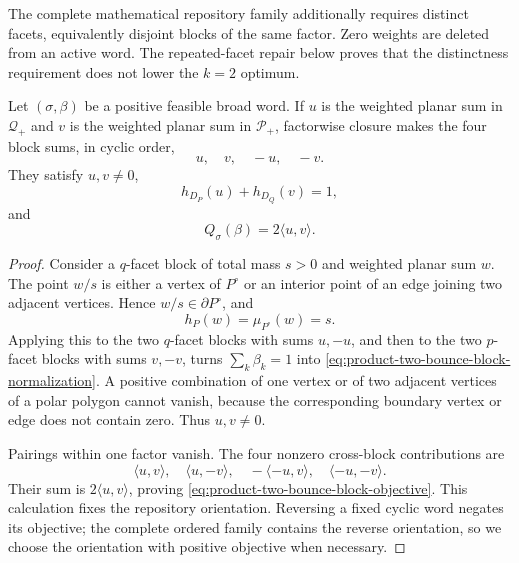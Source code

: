 The complete mathematical repository family additionally requires distinct
facets, equivalently disjoint blocks of the same factor.  Zero weights are
deleted from an active word.  The repeated-facet repair below proves that the
distinctness requirement does not lower the \(k=2\) optimum.

\begin{unverified}
\begin{lemma}
\label{lem:product-two-bounce-block-collapse}
Let \((\sigma,\beta)\) be a positive feasible broad word.  If \(u\) is the
weighted planar sum in \(\mathcal Q_+\) and \(v\) is the weighted planar sum
in \(\mathcal P_+\), factorwise closure makes the four block sums, in cyclic
order,
\[
 u,\quad v,\quad -u,\quad -v.
\]
They satisfy \(u,v\neq0\),
\begin{equation}
\label{eq:product-two-bounce-block-normalization}
 h_{D_P}(u)+h_{D_Q}(v)=1,
\end{equation}
and
\begin{equation}
\label{eq:product-two-bounce-block-objective}
 Q_\sigma(\beta)=2\langle u,v\rangle.
\end{equation}
\end{lemma}

\begin{proof}
Consider a \(q\)-facet block of total mass \(s>0\) and weighted planar sum
\(w\).  The point \(w/s\) is either a vertex of \(P^\circ\) or an interior
point of an edge joining two adjacent vertices.  Hence
\(w/s\in\partial P^\circ\), and
\[
 h_P(w)=\mu_{P^\circ}(w)=s.
\]
Applying this to the two \(q\)-facet blocks with sums \(u,-u\), and then to
the two \(p\)-facet blocks with sums \(v,-v\), turns
\(\sum_k\beta_k=1\) into
\eqref{eq:product-two-bounce-block-normalization}.  A positive combination
of one vertex or of two adjacent vertices of a polar polygon cannot vanish,
because the corresponding boundary vertex or edge does not contain zero.
Thus \(u,v\neq0\).

Pairings within one factor vanish.  The four nonzero cross-block
contributions are
\[
 \langle u,v\rangle,\quad
 \langle u,-v\rangle,\quad
 -\langle -u,v\rangle,\quad
 \langle -u,-v\rangle.
\]
Their sum is \(2\langle u,v\rangle\), proving
\eqref{eq:product-two-bounce-block-objective}.  This calculation fixes the
repository orientation.  Reversing a fixed cyclic word negates its
objective; the complete ordered family contains the reverse orientation, so
we choose the orientation with positive objective when necessary.
\end{proof}


\end{unverified}
